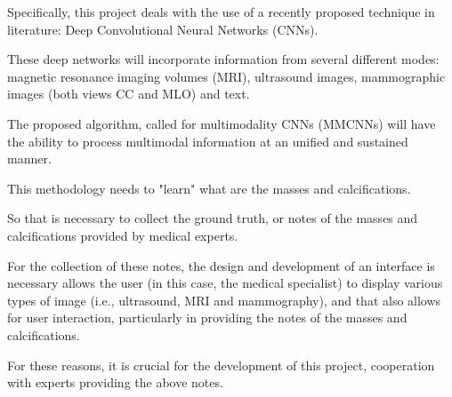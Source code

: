 Specifically, this project deals with the use of a recently proposed technique in literature: Deep Convolutional Neural Networks (CNNs).

These deep networks will incorporate information from several different modes: magnetic resonance imaging volumes (MRI), ultrasound images, mammographic images (both views CC and MLO) and text.

The proposed algorithm, called for multimodality CNNs (MMCNNs) will have the ability to process multimodal information at an unified and sustained manner.

This methodology needs to "learn" what are the masses and calcifications.

So that is necessary to collect the ground truth, or notes of the masses and calcifications provided by medical experts.

\break

For the collection of these notes, the design and development of an interface is necessary allows the user (in this case, the medical specialist) to display various types of image (i.e., ultrasound, MRI and mammography), and that also allows for user interaction, particularly in providing the notes of the masses and calcifications.

For these reasons, it is crucial for the development of this project, cooperation with experts providing the above notes.